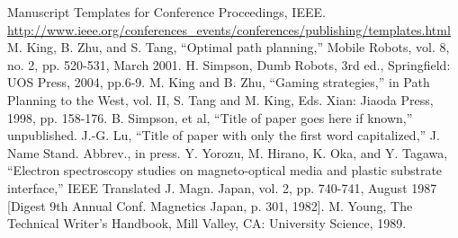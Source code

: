 \begin{thebibliography}{X}
     Manuscript Templates for Conference Proceedings, IEEE. \url{http://www.ieee.org/conferences_events/conferences/publishing/templates.html}
     M. King, B. Zhu, and S. Tang, ``Optimal path planning,'' Mobile Robots, vol. 8, no. 2, pp. 520-531, March 2001.
     H. Simpson, Dumb Robots, 3rd ed., Springfield: UOS Press, 2004, pp.6-9.
     M. King and B. Zhu, ``Gaming strategies,'' in Path Planning to the West, vol. II, S. Tang and M. King, Eds. Xian: Jiaoda Press, 1998, pp. 158-176.
     B. Simpson, et al, ``Title of paper goes here if known,'' unpublished.
     J.-G. Lu, ``Title of paper with only the first word capitalized,'' J. Name Stand. Abbrev., in press.
     Y. Yorozu, M. Hirano, K. Oka, and Y. Tagawa, ``Electron spectroscopy studies on magneto-optical media and plastic substrate interface,'' IEEE Translated J. Magn. Japan, vol. 2, pp. 740-741, August 1987 [Digest 9th Annual Conf. Magnetics Japan, p. 301, 1982]. 
     M. Young, The Technical Writer’s Handbook, Mill Valley, CA: University Science, 1989.
\end{thebibliography}